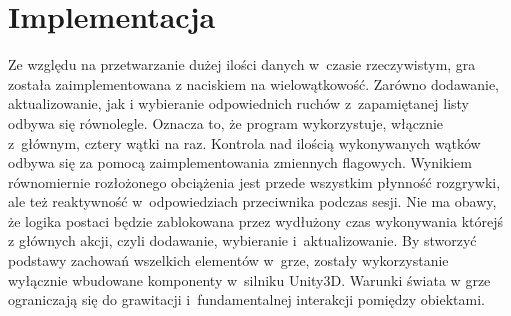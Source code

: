 \documentclass[brudnopis]{xmgr}
\begin{document}
\chapter{Implementacja}
Ze względu na przetwarzanie dużej ilości danych w~czasie rzeczywistym,
gra została zaimplementowana
z naciskiem na wielowątkowość. Zarówno dodawanie, aktualizowanie, jak i
wybieranie odpowiednich ruchów z~zapamiętanej listy odbywa się równolegle. Oznacza to, że program
wykorzystuje, włącznie z~głównym, cztery wątki na raz.
Kontrola nad ilością wykonywanych wątków odbywa się za pomocą
zaimplementowania zmiennych flagowych. Wynikiem równomiernie rozłożonego obciążenia jest przede wszystkim płynność rozgrywki, ale też
reaktywność w~odpowiedziach przeciwnika podczas sesji. Nie ma obawy, że logika postaci będzie zablokowana
przez wydłużony czas wykonywania którejś z
głównych akcji, czyli dodawanie, wybieranie i~aktualizowanie.
By stworzyć podstawy zachowań wszelkich elementów w~grze, zostały wykorzystanie wyłącznie
wbudowane komponenty w~silniku Unity3D. Warunki świata w grze ograniczają się do
grawitacji i~fundamentalnej interakcji pomiędzy obiektami.
\end{document}
